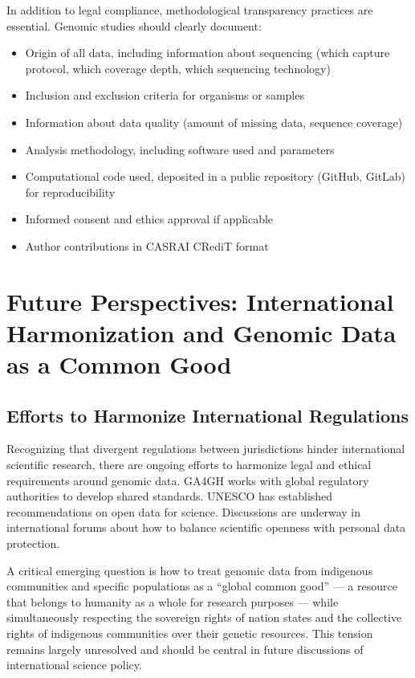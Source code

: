 In addition to legal compliance, methodological transparency practices are essential. Genomic studies should clearly document:

\begin{itemize}
    \item Origin of all data, including information about sequencing (which capture protocol, which coverage depth, which sequencing technology)
    \item Inclusion and exclusion criteria for organisms or samples
    \item Information about data quality (amount of missing data, sequence coverage)
    \item Analysis methodology, including software used and parameters
    \item Computational code used, deposited in a public repository (GitHub, GitLab) for reproducibility
    \item Informed consent and ethics approval if applicable
    \item Author contributions in CASRAI CRediT format
\end{itemize}

\section{Future Perspectives: International Harmonization and Genomic Data as a Common Good}

\subsection{Efforts to Harmonize International Regulations}

Recognizing that divergent regulations between jurisdictions hinder international scientific research, there are ongoing efforts to harmonize legal and ethical requirements around genomic data. GA4GH works with global regulatory authorities to develop shared standards. UNESCO has established recommendations on open data for science. Discussions are underway in international forums about how to balance scientific openness with personal data protection.

A critical emerging question is how to treat genomic data from indigenous communities and specific populations as a ``global common good'' --- a resource that belongs to humanity as a whole for research purposes --- while simultaneously respecting the sovereign rights of nation states and the collective rights of indigenous communities over their genetic resources. This tension remains largely unresolved and should be central in future discussions of international science policy.


